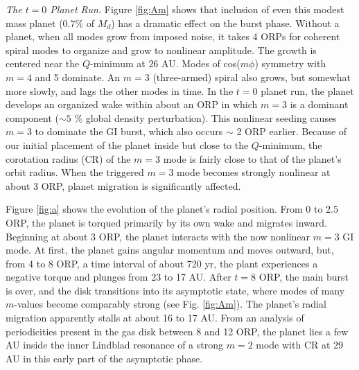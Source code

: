 \documentclass[12pt,manuscript,authoryear]{aastex}
\begin{document}
{\it The $t = 0$ Planet Run.} Figure \ref{fig:Am} shows that inclusion of even this modest mass planet ($0.7 \%$ of $M_d$) has a dramatic effect on the burst phase. Without a planet, when all modes grow from imposed noise, it takes 4 ORPs for coherent spiral modes to organize and grow to nonlinear amplitude. The growth is centered near the $Q$-minimum at $26$ AU. Modes of cos($m\phi$) symmetry with $m = 4$ and 5 dominate. An $m = 3$ (three-armed) spiral also grows, but somewhat more slowly, and lags the other modes in time. In the $t = 0$ planet run, the planet develops an organized wake within about an ORP in which $m = 3$ is a dominant component ($\sim 5$ \% global density perturbation). This nonlinear seeding causes $m = 3$ to dominate the GI burst, which also occurs $\sim$ 2 ORP earlier. Because of our initial placement of the planet inside but close to the $Q$-minimum, the corotation radius (CR) of the $m = 3$ mode is fairly close to that of the planet's orbit radius. When the triggered $m = 3$ mode becomes strongly nonlinear at about 3 ORP, planet migration is significantly affected.

Figure \ref{fig:a} shows the evolution of the planet's radial position. From 0 to 2.5 ORP, the planet is torqued primarily by its own wake and migrates inward. 
Beginning at about 3 ORP, the planet interacts with the now nonlinear $m = 3$ GI mode. At first, the planet gains angular momentum and moves outward, but, from 4 to 8 ORP, a time interval of  about 720 yr, the plant experiences a negative torque and plunges from 23 to 17 AU.
After $t = 8$ ORP, the main burst is over, and the disk transitions into its asymptotic state, where modes of many $m$-values become comparably strong (see Fig. \ref{fig:Am}). The planet's radial migration apparently stalls at about 16 to 17 AU. From an analysis of periodicities present in the gas disk between 8 and 12 ORP, the planet lies a few AU inside the inner Lindblad resonance of a strong $m = 2$ mode with CR at 29 AU in this early part of the asymptotic phase. 
\end{document}
